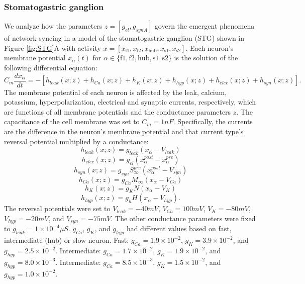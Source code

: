 \documentclass[11pt]{article}
\begin{document}
\subsubsection{Stomatogastric ganglion}\label{methods_STG}
We analyze how the parameters $z = [ g_{el}, g_{synA}]$ govern the emergent phenomena of network syncing in a model of the stomatogastric ganglion (STG) shown in Figure \ref{fig:STG}A with activity $x = \left[ x_{\text{f1}}, x_{\text{f2}}, x_{\text{hub}}, x_{\text{s1}}, x_{\text{s2}} \right]$.
Each neuron's membrane potential $x_\alpha(t)$ for $\alpha \in \{ \text{f1}, \text{f2}, \text{hub}, \text{s1}, \text{s2} \}$ is the solution of the following differential equation:
\begin{equation} C_m \frac{dx_\alpha}{dt} = - \left[ h_{leak}(x; z) + h_{Ca}(x; z) + h_K(x; z) + h_{hyp}(x; z) + h_{elec}(x; z) + h_{syn}(x; z)\right].
\end{equation} 
The membrane potential of each neuron is affected by the leak, calcium, potassium, hyperpolarization,
electrical and synaptic currents, respectively, which are functions of  all membrane potentials and the conductance parameters $z$.  
The capacitance of the cell membrane was set to $C_m = 1nF$. Specifically, the currents are the difference in the neuron's membrane potential and that current type's reversal potential multiplied by a conductance:
\begin{equation}  h_{leak}(x; z) = g_{leak} (x_\alpha - V_{leak}) 
\end{equation} 
\begin{equation}  h_{elec}(x; z) = g_{el} (x_\alpha^{post} - x_\alpha^{pre})
\end{equation} 
\begin{equation}  h_{syn}(x; z) = g_{syn} S_\infty^{pre} (x_\alpha^{post} - V_{syn}) \end{equation} 
\begin{equation}  h_{Ca}(x; z) = g_{Ca} M_\infty (x_\alpha - V_{Ca}) 
\end{equation} 
\begin{equation}  h_K(x; z) = g_K N (x_\alpha - V_K) 
\end{equation} 
\begin{equation}  h_{hyp}(x; z) = g_h H(x_\alpha - V_{hyp}).
\end{equation} 
The reversal potentials were set to $V_{leak} = -40mV$, $V_{Ca} = 100mV$, $V_K = -80mV$, $V_{hyp} = -20mV$, and $V_{syn} = -75mV$.  The other conductance parameters were fixed to $g_{leak} = 1 \times 10^{-4} \mu S$. $g_{Ca}$, $g_{K}$, and $g_{hyp}$ had different values based on fast, intermediate (hub) or slow neuron.  Fast: $g_{Ca} = 1.9 \times 10^{-2}$, $ g_K = 3.9 \times 10^{-2} $, and $ g_{hyp} = 2.5 \times 10^{-2} $.  Intermediate: $g_{Ca} = 1.7 \times 10^{-2}$, $ g_K = 1.9 \times 10^{-2} $, and $ g_{hyp} = 8.0 \times 10^{-3} $.  Intermediate: $g_{Ca} = 8.5 \times 10^{-3}$, $ g_K = 1.5 \times 10^{-2} $, and $ g_{hyp} = 1.0 \times 10^{-2} $.
\end{document}
